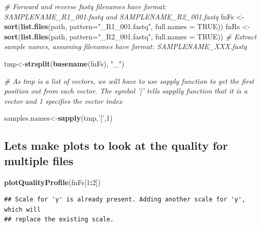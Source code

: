 \documentclass[
]{book}
\newenvironment{Shaded}{\begin{snugshade}}{\end{snugshade}}
\newcommand{\CommentTok}[1]{\textcolor[rgb]{0.56,0.35,0.01}{\textit{#1}}}
\newcommand{\DataTypeTok}[1]{\textcolor[rgb]{0.13,0.29,0.53}{#1}}
\newcommand{\DecValTok}[1]{\textcolor[rgb]{0.00,0.00,0.81}{#1}}
\newcommand{\KeywordTok}[1]{\textcolor[rgb]{0.13,0.29,0.53}{\textbf{#1}}}
\newcommand{\NormalTok}[1]{#1}
\newcommand{\OperatorTok}[1]{\textcolor[rgb]{0.81,0.36,0.00}{\textbf{#1}}}
\newcommand{\OtherTok}[1]{\textcolor[rgb]{0.56,0.35,0.01}{#1}}
\newcommand{\StringTok}[1]{\textcolor[rgb]{0.31,0.60,0.02}{#1}}
\begin{document}
\begin{Shaded}
\begin{Highlighting}[]
\CommentTok{# Forward and reverse fastq filenames have format: SAMPLENAME_R1_001.fastq and SAMPLENAME_R2_001.fastq}
\NormalTok{fnFs <-}\StringTok{ }\KeywordTok{sort}\NormalTok{(}\KeywordTok{list.files}\NormalTok{(path, }\DataTypeTok{pattern=}\StringTok{"_R1_001.fastq"}\NormalTok{, }\DataTypeTok{full.names =} \OtherTok{TRUE}\NormalTok{))}
\NormalTok{fnRs <-}\StringTok{ }\KeywordTok{sort}\NormalTok{(}\KeywordTok{list.files}\NormalTok{(path, }\DataTypeTok{pattern=}\StringTok{"_R2_001.fastq"}\NormalTok{, }\DataTypeTok{full.names =} \OtherTok{TRUE}\NormalTok{))}
\CommentTok{# Extract sample names, assuming filenames have format: SAMPLENAME_XXX.fastq}


\NormalTok{tmp<-}\KeywordTok{strsplit}\NormalTok{(}\KeywordTok{basename}\NormalTok{(fnFs), }\StringTok{"_"}\NormalTok{)}


\CommentTok{# As tmp is a list of vectors, we will have to use sapply function to get the first position out from each vector. The symbol '[' tells sapplly function that it is a vector and 1 specifies the vector index}

\NormalTok{samples.names<-}\KeywordTok{sapply}\NormalTok{(tmp,}\StringTok{'['}\NormalTok{,}\DecValTok{1}\NormalTok{)}
\end{Highlighting}
\end{Shaded}

\hypertarget{lets-make-plots-to-look-at-the-quality-for-multiple-files}{%
\subsection{Lets make plots to look at the quality for multiple files}\label{lets-make-plots-to-look-at-the-quality-for-multiple-files}}

\begin{Shaded}
\begin{Highlighting}[]
\KeywordTok{plotQualityProfile}\NormalTok{(fnFs[}\DecValTok{1}\OperatorTok{:}\DecValTok{2}\NormalTok{])}
\end{Highlighting}
\end{Shaded}

\begin{verbatim}
## Scale for 'y' is already present. Adding another scale for 'y', which will
## replace the existing scale.
\end{verbatim}
\end{document}
